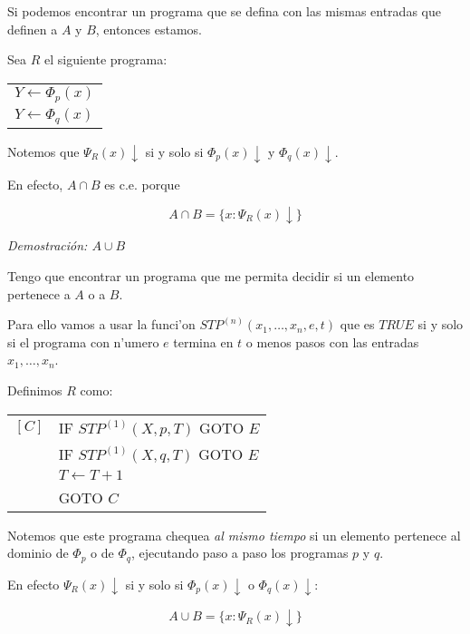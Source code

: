 \begin{questions}
\begin{solution}
  Si podemos encontrar un programa que se defina con las mismas entradas que definen a $A$ y $B$, entonces estamos. 

  Sea $R$ el siguiente programa: 

  \vspace{0.5cm}
  \begin{tabular}{l}
  $Y \leftarrow \Phi_p(x)$ \\ 
  $Y \leftarrow \Phi_q(x)$
  \end{tabular}
  \vspace{0.5cm}

  Notemos que $\Psi_R(x)\downarrow$ si y solo si $\Phi_p(x)\downarrow$ y $\Phi_q(x)\downarrow$. 

  En efecto, $A\cap B$ es c.e. porque

  \begin{equation*}
  A\cap B = \{ x : \Psi_R(x)\downarrow \}
  \end{equation*}

  {\it Demostraci\'on: $A\cup B$}

  Tengo que encontrar un programa que me permita decidir si un elemento pertenece a $A$ o a $B$. 

  Para ello vamos a usar la funci'on $STP^{(n)}(x_1, \dots, x_n, e, t)$ que es $TRUE$ si y solo si el programa con n'umero $e$ termina en $t$ o menos pasos con las entradas $x_1, \dots, x_n$. 

  Definimos $R$ como: 

  \vspace{0.5cm}
  \begin{tabular}{rl}
  $[C]$ & IF $STP^{(1)}(X, p, T)$ GOTO $E$ \\
      & IF $STP^{(1)}(X, q, T)$ GOTO $E$ \\
      & $T \leftarrow T + 1$ \\
      & GOTO $C$
  \end{tabular}
  \vspace{0.5cm}

  Notemos que este programa chequea \emph{al mismo tiempo} si un elemento pertenece al dominio de $\Phi_p$ o de $\Phi_q$, ejecutando paso a paso los programas $p$ y $q$. 

  En efecto $\Psi_R(x)\downarrow$ si y solo si $\Phi_p(x)\downarrow$ o $\Phi_q(x)\downarrow$: 

  \begin{equation*}
  A\cup B = \{ x : \Psi_R(x)\downarrow \}
  \end{equation*}


\end{solution}
\end{questions}
